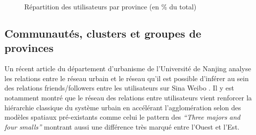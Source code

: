 \begin{figure}[h!]
    \centering
    \caption{
        R\'epartition des utilisateurs par province (en \% du total)
    }

\end{figure}


\subsection{Communaut\'es, clusters et groupes de provinces}

Un r\'ecent article du d\'epartement d{\textquoteright}urbanisme de l{\textquoteright}Universit\'e de Nanjing \citep{Zhen2013} analyse les relations entre le r\'eseau urbain et le r\'eseau qu{\textquoteright}il est possible d{\textquoteright}inf\'erer au sein des relations friends/followers entre les utilisateurs sur Sina Weibo . Il y est notamment montr\'e que le r\'eseau des relations entre utilisateurs vient renforcer la hi\'erarchie classique du syst\`eme urbain en acc\'el\'erant l{\textquoteright}agglom\'eration selon des mod\`eles spatiaux pr\'e-existants comme celui le pattern des \textit{{\textquotedblleft}Three majors }\textit{and four smalls{\textquotedblright} }montrant aussi une diff\'erence tr\`es marqu\'e entre l{\textquoteright}Ouest et l{\textquoteright}Est. 

